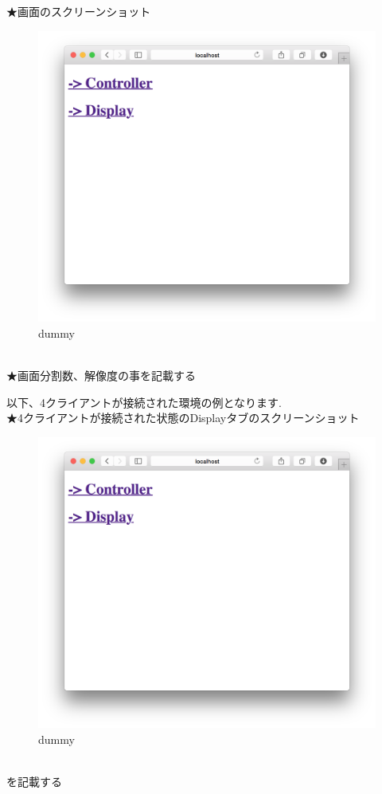 \documentclass[a4paper,10pt,oneside]{jsbook}
\begin{document}
★画面のスクリーンショット
\begin{figure}[htbp]
	\begin{center}
		\includegraphics[width=11.5cm]{image/home.png}
	\end{center}
	\caption{dummy}
	\label{fig:home}
\end{figure}
\\

★画面分割数、解像度の事を記載する



以下、4クライアントが接続された環境の例となります.\\
★4クライアントが接続された状態のDisplayタブのスクリーンショット
\begin{figure}[htbp]
	\begin{center}
		\includegraphics[width=11.5cm]{image/home.png}
	\end{center}
	\caption{dummy}
	\label{fig:home}
\end{figure}
\\を記載する
\end{document}
